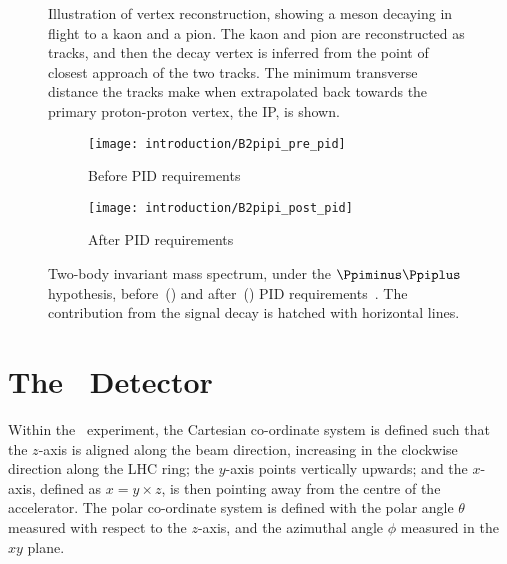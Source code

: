 \begin{figure}
  \centering
  
  \caption{%
    Illustration of vertex reconstruction, showing a \PDz meson decaying in 
    flight to a kaon and a pion.
    The kaon and pion are reconstructed as tracks, and then the \PDzero decay 
    vertex is inferred from the point of closest approach of the two tracks.
    The minimum transverse distance the tracks make when extrapolated back 
    towards the primary proton-proton vertex, the \acf{IP}, is shown.
  }
  \label{fig:intro:lhcb:vertexing}
\end{figure}

\begin{figure}
  \begin{subfigure}[b]{0.5\textwidth}
    \centering
    \texttt{[image: introduction/B2pipi\_pre\_pid]}
    \caption{Before \ac{PID} requirements}
    \label{fig:intro:lhcb:pid_power:pre}
  \end{subfigure}
  \begin{subfigure}[b]{0.5\textwidth}
    \centering
    \texttt{[image: introduction/B2pipi\_post\_pid]}
    \caption{After \ac{PID} requirements}
    \label{fig:intro:lhcb:pid_power:post}
  \end{subfigure}
  \caption{%
    Two-body invariant mass spectrum, under the $\pimpip$ hypothesis, 
    before~() and 
    after~() \ac{PID} 
    requirements~\cite{Aaij:2012as}.
    The contribution from the signal decay is hatched with horizontal lines.
  }
  \label{fig:intro:lhcb:pid_power}
\end{figure}

\section{The \lhcb\ Detector}
\label{chap:intro:lhcb:detector}

Within the \lhcb\ experiment, the Cartesian co-ordinate system is defined such 
that the $z$-axis is aligned along the beam direction, increasing in the 
clockwise direction along the \ac{LHC} ring; the $y$-axis points vertically 
upwards; and the $x$-axis, defined as $x = y \times z$, is then pointing away 
from the centre of the accelerator.
The polar co-ordinate system is defined with the polar angle $\theta$ measured 
with respect to the $z$-axis, and the azimuthal angle $\phi$ measured in the 
$xy$ plane.

